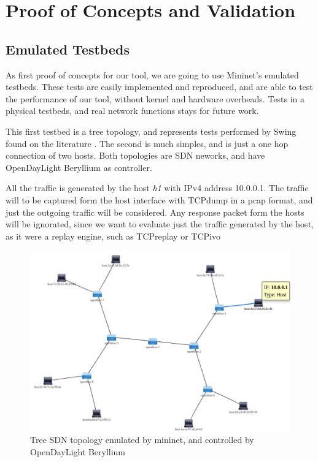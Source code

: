 \chapter{Proof of Concepts and Validation}

\section{Emulated Testbeds}


As first proof of concepts for our tool, we are going to use Mininet's emulated testbeds. These tests are easily implemented and reproduced, and are able to test the performance of our tool, without kernel and hardware overheads. Tests in a physical testbeds, and real network functions stays for future work.

This first testbed is a tree topology, and represents tests performed by Swing\cite{swing-paper} found on the literature \cite{background-traffic-matter}\cite{legotg-paper}. The second is much simples, and is just a one hop connection of two hosts. Both topologies are SDN neworks, and have OpenDayLight Beryllium as controller. 


All the traffic is generated by the host \textit{h1} with IPv4 address 10.0.0.1. The traffic will to be captured form the host interface with TCPdump in a pcap format, and just the outgoing traffic will be considered. Any response packet form the hosts will be ignorated, since we want to evaluate just the traffic generated by the host, as it were a replay engine, such as TCPreplay or TCPivo\cite{tcpivo-paper}


\begin{figure}[!ht]
	\centering
	\includegraphics[scale=0.4]{figures/ch5/topo-tree}
	\caption{Tree SDN topology emulated by mininet, and controlled by OpenDayLight Beryllium}
	\label{fig:topo-tree}
\end{figure}

